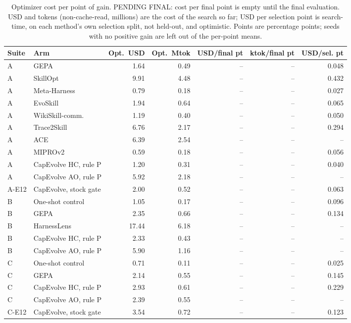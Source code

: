 \begin{table}[t]
\centering
\scriptsize
\caption{Optimizer cost per point of gain. PENDING FINAL: cost per final point is empty until the final evaluation. USD and tokens (non-cache-read, millions) are the cost of the search so far; USD per selection point is search-time, on each method's own selection split, not held-out, and optimistic. Points are percentage points; seeds with no positive gain are left out of the per-point means.}
\label{tab:attrib-cost}
\begin{tabular}{@{}llrrrrr@{}}
\toprule
Suite & Arm & Opt.\ USD & Opt.\ Mtok & USD/final pt & ktok/final pt & USD/sel. pt \\
\midrule
A & GEPA & 1.64 & 0.49 & -- & -- & 0.048 \\
A & SkillOpt & 9.91 & 4.48 & -- & -- & 0.432 \\
A & Meta-Harness & 0.79 & 0.18 & -- & -- & 0.027 \\
A & EvoSkill & 1.94 & 0.64 & -- & -- & 0.065 \\
A & WikiSkill-comm. & 1.19 & 0.40 & -- & -- & 0.050 \\
A & Trace2Skill & 6.76 & 2.17 & -- & -- & 0.294 \\
A & ACE & 6.39 & 2.54 & -- & -- & -- \\
A & MIPROv2 & 0.59 & 0.18 & -- & -- & 0.056 \\
A & CapEvolve HC, rule P & 1.20 & 0.31 & -- & -- & 0.040 \\
A & CapEvolve AO, rule P & 5.92 & 2.18 & -- & -- & -- \\
A-E12 & CapEvolve, stock gate & 2.00 & 0.52 & -- & -- & 0.063 \\
B & One-shot control & 1.05 & 0.17 & -- & -- & 0.096 \\
B & GEPA & 2.35 & 0.66 & -- & -- & 0.134 \\
B & HarnessLens & 17.44 & 6.18 & -- & -- & -- \\
B & CapEvolve HC, rule P & 2.33 & 0.43 & -- & -- & -- \\
B & CapEvolve AO, rule P & 5.90 & 1.16 & -- & -- & -- \\
C & One-shot control & 0.71 & 0.11 & -- & -- & 0.025 \\
C & GEPA & 2.14 & 0.55 & -- & -- & 0.145 \\
C & CapEvolve HC, rule P & 2.93 & 0.61 & -- & -- & 0.229 \\
C & CapEvolve AO, rule P & 2.39 & 0.55 & -- & -- & -- \\
C-E12 & CapEvolve, stock gate & 3.54 & 0.72 & -- & -- & 0.123 \\

\end{tabular}
\end{table}
